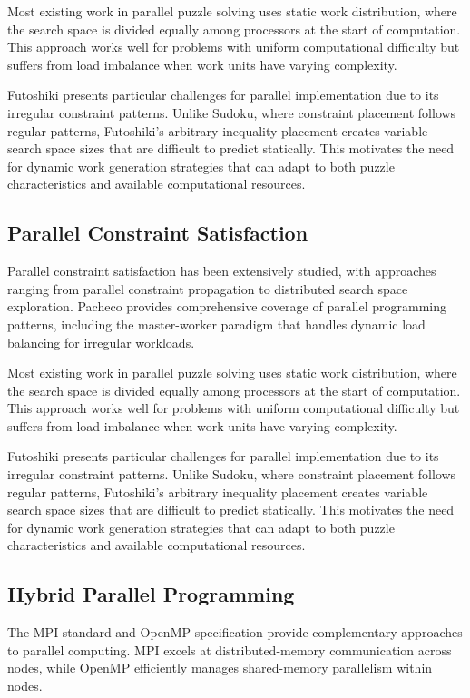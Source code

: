 Most existing work in parallel puzzle solving uses static work distribution, where the search space is divided equally among processors at the start of computation. This approach works well for problems with uniform computational difficulty but suffers from load imbalance when work units have varying complexity.

Futoshiki presents particular challenges for parallel implementation due to its irregular constraint patterns. Unlike Sudoku, where constraint placement follows regular patterns, Futoshiki's arbitrary inequality placement creates variable search space sizes that are difficult to predict statically. This motivates the need for dynamic work generation strategies that can adapt to both puzzle characteristics and available computational resources.
\subsection{Parallel Constraint Satisfaction}
\label{subsec:parallel_csp}
Parallel constraint satisfaction has been extensively studied, with approaches ranging from parallel constraint propagation to distributed search space exploration. Pacheco \cite{Pacheco2011} provides comprehensive coverage of parallel programming patterns, including the master-worker paradigm that handles dynamic load balancing for irregular workloads.

Most existing work in parallel puzzle solving uses static work distribution, where the search space is divided equally among processors at the start of computation. This approach works well for problems with uniform computational difficulty but suffers from load imbalance when work units have varying complexity.

Futoshiki presents particular challenges for parallel implementation due to its irregular constraint patterns. Unlike Sudoku, where constraint placement follows regular patterns, Futoshiki's arbitrary inequality placement creates variable search space sizes that are difficult to predict statically. This motivates the need for dynamic work generation strategies that can adapt to both puzzle characteristics and available computational resources.

\subsection{Hybrid Parallel Programming}
\label{subsec:hybrid_programming}
The MPI standard \cite{MPIForum2021} and OpenMP specification \cite{OpenMP2020} provide complementary approaches to parallel computing. MPI excels at distributed-memory communication across nodes, while OpenMP efficiently manages shared-memory parallelism within nodes.
